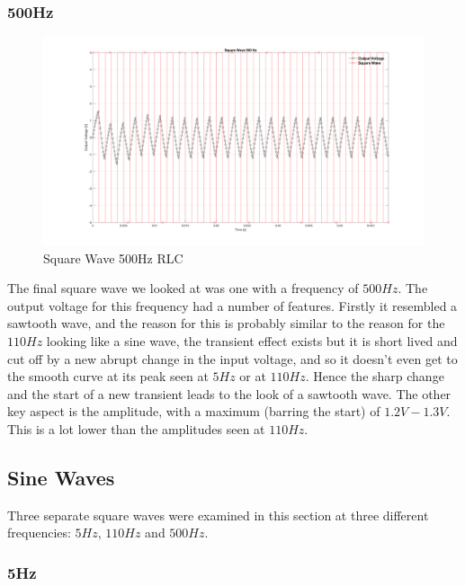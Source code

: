\documentclass[a4paper, 12pt]{article}
\begin{document}
\newpage
\subsubsection{500Hz}

\begin{figure}[h]
\centering
\includegraphics[width=\textwidth]{ex3/Square_Wave_500_Hz.png}
\caption{Square Wave 500Hz RLC}
\end{figure}


The final square wave we looked at was one with a frequency of $500Hz$. The output voltage for this frequency had a number of features. Firstly it resembled a sawtooth wave, and the reason for this is probably similar to the reason for the $110Hz$ looking like a sine wave, the transient effect exists but it is short lived and cut off by a new abrupt change in the input voltage, and so it doesn't even get to the smooth curve at its peak seen at $5Hz$ or at $110Hz$. Hence the sharp change and the start of a new transient leads to the look of a sawtooth wave. The other key aspect is the amplitude, with a maximum (barring the start) of $1.2V-1.3V$. This is a lot lower than the amplitudes seen at $110Hz$.

\newpage
\subsection{Sine Waves}

Three separate square waves were examined in this section at three different frequencies: $5Hz$, $110Hz$ and $500Hz$.

\subsubsection{5Hz}
\end{document}
